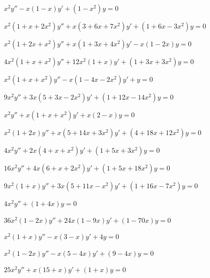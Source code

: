 \begin{exerciselist}
  \item\label{exer:7.6.1} \Cex $x^{2}y''-x(1-x)y'+(1-x^{2})y=0$

  \item\label{exer:7.6.2} \Cex $x^{2}(1+x+2x^{2})y''+x(3+6x+7x^{2})y'+(1+6x-3x^{2})y=0$

  \item\label{exer:7.6.3} \Cex $x^{2}(1+2x+x^{2})y''+x(1+3x+4x^{2})y'-x(1-2x)y=0$

  \item\label{exer:7.6.4} \Cex $4x^{2}(1+x+x^{2})y''+12x^{2}(1+x)y'+(1+3x+3x^{2})y=0$

  \item\label{exer:7.6.5} \Cex $x^{2}(1+x+x^{2})y''-x(1-4x-2x^{2})y'+y=0$

  \item\label{exer:7.6.6} \Cex $9x^{2}y''+3x(5+3x-2x^{2})y'+(1+12x-14x^{2})y=0$

  \item\label{exer:7.6.7} \Cex $x^{2}y''+x(1+x+x^{2})y'+x(2-x)y=0$

  \item\label{exer:7.6.8} \Cex $x^{2}(1+2x)y''+x(5+14x+3x^{2})y'+(4+18x+12x^{2})y=0$

  \item\label{exer:7.6.9} \Cex $4x^{2}y''+2x(4+x+x^{2})y'+(1+5x+3x^{2})y=0$

  \item\label{exer:7.6.10} \Cex $16x^{2}y''+4x(6+x+2x^{2})y'+(1+5x+18x^{2})y=0$

  \item\label{exer:7.6.11} \Cex $9x^{2}(1+x)y''+3x(5+11x-x^{2})y'+(1+16x-7x^{2})y=0$


  \item\label{exer:7.6.12} $4x^{2}y''+(1+4x)y=0$

  \item\label{exer:7.6.13} $36x^{2}(1-2x)y''+24x(1-9x)y'+(1-70x)y=0$

  \item\label{exer:7.6.14} $x^{2}(1+x)y''-x(3-x)y'+4y=0$

  \item\label{exer:7.6.15} $x^{2}(1-2x)y''-x(5-4x)y'+(9-4x)y=0$

  \item\label{exer:7.6.16} $25x^{2}y''+x(15+x)y'+(1+x)y=0$


\end{exerciselist}
